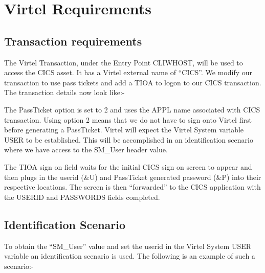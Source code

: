 \documentclass[letterpaper,10pt,english]{sphinxmanual}
\begin{document}
\newpage

\ignorespaces 

\section{Virtel Requirements}
\label{\detokenize{connectivity_guide:virtel-requirements}}\label{\detokenize{connectivity_guide:index-166}}

\subsection{Transaction requirements}
\label{\detokenize{connectivity_guide:transaction-requirements}}
The Virtel Transaction, under the Entry Point CLIWHOST, will be used to access the CICS asset. It has a Virtel external name of “CICS”. We modify our transaction to use pass tickets and add a TIOA to logon to our CICS transaction. The transaction details now look like:-

 

The PassTicket option is set to 2 and uses the APPL name associated with CICS transaction. Using option 2 means that we do not have to sign onto Virtel first before generating a PassTicket. Virtel will expect the Virtel System variable USER to be established. This will be accomplished in an identification scenario where we have access to the SM\_User header value.

The TIOA sign on field waits for the initial CICS sign on screen to appear and then plugs in the userid (\&U) and PassTicket generated password (\&P) into their respective locations. The screen is then “forwarded” to the CICS application with the USERID and PASSWORDS fields completed.

\newpage


\subsection{Identification Scenario}
\label{\detokenize{connectivity_guide:identification-scenario}}
To obtain the “SM\_User” value and set the userid in the Virtel System USER variable an identification scenario is used. The following is an example of such a scenario:-
\end{document}
